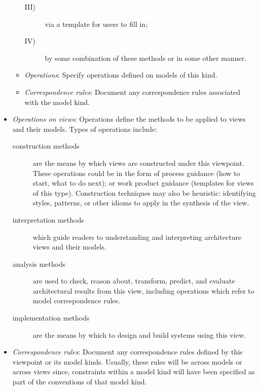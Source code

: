 \begin{itemize}
\begin{itemize}
\begin{description}
\item[III)] via a template for users to fill in;
\item[IV)] by some combination of these methods or in some other
  manner.
\end{description}
\item {\em Operations}: Specify operations defined on models of this kind.
\item {\em Correspondence rules}: Document any correspondence rules associated with the model
  kind.
\end{itemize}
\item {\em Operations on views}: Operations define the methods to be applied to views and their models.
Types of operations include:
\begin{description}
\item[construction methods] are the means by which views are
  constructed under this viewpoint. These operations could be in the
  form of process guidance (how to start, what to do next); or work
  product guidance (templates for views of this type). Construction
  techniques may also be heuristic: identifying styles, patterns, or
  other idioms to apply in the synthesis of the view.
\item[interpretation methods] which guide readers to understanding
  and interpreting architecture views and their models.
\item[analysis methods] are used to check, reason about, transform,
  predict, and evaluate architectural results from this view,
  including operations which refer to model correspondence rules.
\item[implementation methods] are the means by which to design and
  build systems using this view.
\end{description}
\item {\em Correspondence rules}: 
Document any correspondence rules defined by this viewpoint or
  its model kinds.
Usually, these rules will be across models or across views since,
constraints within a model kind will have been specified as part of
the conventions of that model kind.

\end{itemize}
